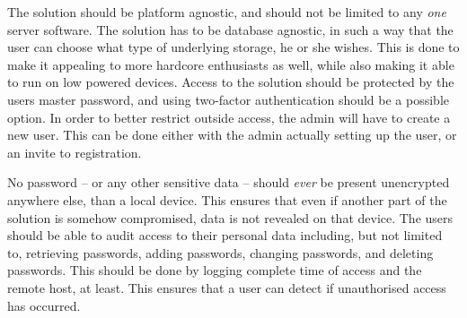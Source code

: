 			The solution should be platform agnostic, and should not be limited to any \emph{one} server software. The solution has to be database agnostic, in such a way that the user can choose what type of underlying storage, he or she wishes. This is done to make it appealing to more hardcore enthusiasts as well, while also making it able to run on low powered devices. Access to the solution should be protected by the users master password, and using two-factor authentication should be a possible option. In order to better restrict outside access, the admin will have to create a new user. This can be done either with the admin actually setting up the user, or an invite to registration.

			No password -- or any other sensitive data -- should \emph{ever} be present unencrypted anywhere else, than a local device. This ensures that even if another part of the solution is somehow compromised, data is not revealed on that device.  The users should be able to audit access to their personal data including, but not limited to, retrieving passwords, adding passwords, changing passwords, and deleting passwords. This should be done by logging complete time of access and the remote host, at least. This ensures that a user can detect if unauthorised access has occurred.

